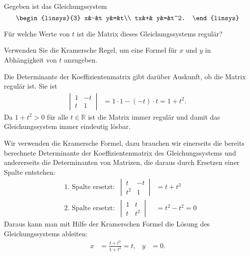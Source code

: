 Gegeben ist das Gleichungssystem
\[
\begin{linsys}{3}
 x&-&t y&=&t\\
tx&+&  y&=&t^2.
\end{linsys}
\]
\begin{teilaufgaben}
\item Für welche Werte von $t$ ist die Matrix dieses Gleichungssystems
regulär?
\item
Verwenden Sie die Kramersche Regel, um 
eine Formel für $x$ und $y$ in Abhängigkeit von $t$ anzugeben.
\end{teilaufgaben}


\begin{loesung}
\begin{teilaufgaben}
\item
Die Determinante der Koeffizientenmatrix gibt darüber Auskunft, ob die
Matrix regulär ist. Sie ist
\begin{align*}
\left|\,\begin{matrix}1&-t\\t&1\end{matrix}\,\right|
&=1\cdot 1-(-t)\cdot t=1+t^2.
\end{align*}
Da $1+t^2>0$ für alle $t\in\mathbb R$ ist die Matrix immer regulär und
damit das Gleichungssystem immer eindeutig lösbar.
\item
Wir verwenden die Kramersche Formel, dazu brauchen wir einerseits die bereits
berechnete Determinante der Koeffizientenmatrix des Gleichungssystems
und andererseits die Determinanten von Matrizen, die daraus durch Ersetzen
einer Spalte entstehen:
\begin{align*}
&\text{1.~Spalte ersetzt:}&
\left|\,\begin{matrix}t&-t\\t^2&1\end{matrix}\,\right|
&=t+t^3
\\
&\text{2.~Spalte ersetzt:}&
\left|\,\begin{matrix}1&t\\t&t^2\end{matrix}\,\right|
&=t^2-t^2=0
\end{align*}
Daraus kann man mit Hilfe der Kramerschen Formel die Lösung des
Gleichungssystems ableiten:
\begin{align*}
x&=\frac{t+t^3}{1+t^2}=t,&
y&=0.
\end{align*}
\qedhere
\end{teilaufgaben}
\end{loesung}
